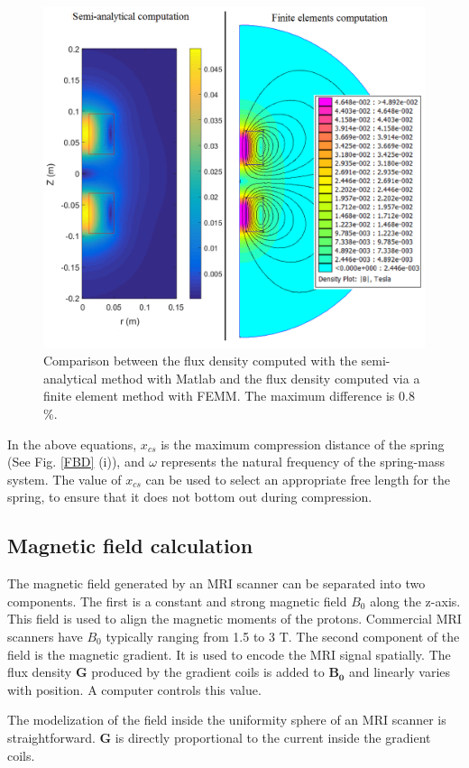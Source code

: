 \documentclass[letterpaper, 10 pt, conference]{ieeeconf}  %
\begin{document}
\begin{figure}
	\includegraphics[width=\linewidth]{Femm_matlab_comparison.png}
	\caption{Comparison between the flux density computed with the semi-analytical method with {\sc Matlab} and the flux density computed via a finite element method with FEMM. The maximum difference is 0.8 \%.}
	\label{Femm_matlab_comparison}
	\vspace{-2em}
\end{figure}

In the above equations, $x_{cs}$ is the maximum compression distance of the spring (See Fig. \ref{FBD} (i)), and $\omega$ represents the natural frequency of the spring-mass system. The value of $x_{cs}$ can be used to select an appropriate free length for the spring, to ensure that it does not bottom out during compression. 
\subsection{Magnetic field calculation}
\label{magfield}
The magnetic field generated by an MRI scanner can be separated into two components. The first is a constant and strong magnetic field $B_0$ along the z-axis. This field is used to align the magnetic moments of the protons. Commercial MRI scanners have $B_0$ typically ranging from 1.5 to 3 T. The second component of the field is the magnetic gradient. It is used to encode the MRI signal spatially. The flux density $\mathbf{G}$ produced by the gradient coils is added to $\mathbf{B_0}$ and linearly varies with position. A computer controls this value.\par
The modelization of the field inside the uniformity sphere of an MRI scanner is straightforward. $\mathbf{G}$ is directly proportional to the current inside the gradient coils. 
\end{document}
